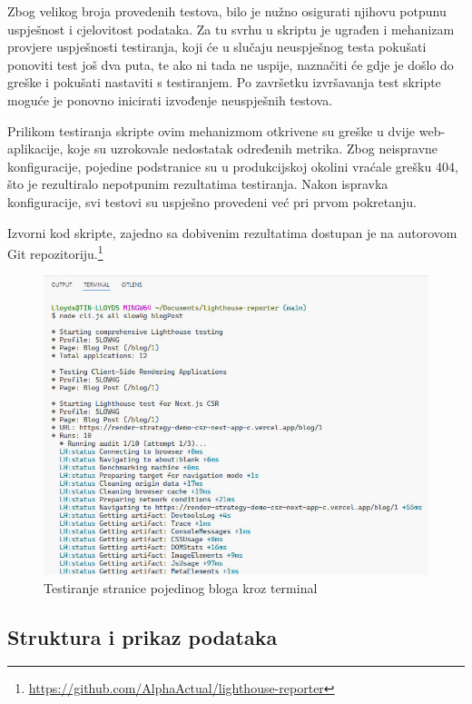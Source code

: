 \bigskip

Zbog velikog broja provedenih testova, bilo je nužno osigurati njihovu potpunu uspješnost i cjelovitost podataka. Za tu svrhu u skriptu je ugrađen i mehanizam provjere uspješnosti testiranja, koji će u slučaju neuspješnog testa pokušati ponoviti test još dva puta, te ako ni tada ne uspije, naznačiti će gdje je došlo do greške i pokušati nastaviti s testiranjem. Po završetku izvršavanja test skripte moguće je ponovno inicirati izvođenje neuspješnih testova.

\bigskip

Prilikom testiranja skripte ovim mehanizmom otkrivene su greške u dvije web-aplikacije, koje su uzrokovale nedostatak određenih metrika. Zbog neispravne konfiguracije, pojedine podstranice su u produkcijskoj okolini vraćale grešku 404, što je rezultiralo nepotpunim rezultatima testiranja. Nakon ispravka konfiguracije, svi testovi su uspješno provedeni već pri prvom pokretanju.

\bigskip

Izvorni kod skripte, zajedno sa dobivenim rezultatima dostupan je na autorovom Git repozitoriju.\footnote{\url{https://github.com/AlphaActual/lighthouse-reporter}}

\begin{figure}[H]
    \centering
    \includegraphics[width=\textwidth]{slike/metodologija/testiranje-aplikacije.jpg}
    \caption{Testiranje stranice pojedinog bloga kroz terminal}
    \label{fig:testiranje-aplikacije}
\end{figure}

\subsection{Struktura i prikaz podataka}

